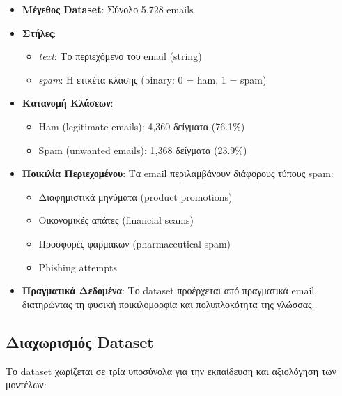 \documentclass[12pt,a4paper,twoside]{book}
\begin{document}
\begin{itemize}
    \item \textbf{Μέγεθος Dataset}: Σύνολο 5,728 emails
    \item \textbf{Στήλες}:
          \begin{itemize}
              \item \textit{text}: Το περιεχόμενο του email (string)
              \item \textit{spam}: Η ετικέτα κλάσης (binary: 0 = ham, 1 = spam)
          \end{itemize}
    \item \textbf{Κατανομή Κλάσεων}:
          \begin{itemize}
              \item Ham (legitimate emails): 4,360 δείγματα (76.1\%)
              \item Spam (unwanted emails): 1,368 δείγματα (23.9\%)
          \end{itemize}
    \item \textbf{Ποικιλία Περιεχομένου}: Τα email περιλαμβάνουν διάφορους τύπους spam:
          \begin{itemize}
              \item Διαφημιστικά μηνύματα (product promotions)
              \item Οικονομικές απάτες (financial scams)
              \item Προσφορές φαρμάκων (pharmaceutical spam)
              \item Phishing attempts
          \end{itemize}
    \item \textbf{Πραγματικά Δεδομένα}: Το dataset προέρχεται από πραγματικά email, διατηρώντας τη φυσική ποικιλομορφία και πολυπλοκότητα της γλώσσας.
\end{itemize}

\subsection{Διαχωρισμός Dataset}

Το dataset χωρίζεται σε τρία υποσύνολα για την εκπαίδευση και αξιολόγηση των μοντέλων:
\end{document}
